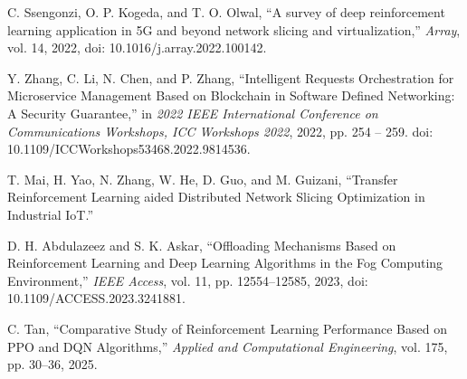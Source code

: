 \cite{b37} C. Ssengonzi, O. P. Kogeda, and T. O. Olwal, ``A survey of deep reinforcement learning application in 5G and beyond network slicing and virtualization,'' \emph{Array}, vol. 14, 2022, doi: 10.1016/j.array.2022.100142.

\cite{b38} Y. Zhang, C. Li, N. Chen, and P. Zhang, ``Intelligent Requests Orchestration for Microservice Management Based on Blockchain in Software Defined Networking: A Security Guarantee,'' in \emph{2022 IEEE International Conference on Communications Workshops, ICC Workshops 2022}, 2022, pp. 254 -- 259. doi: 10.1109/ICCWorkshops53468.2022.9814536.

\cite{b39} T. Mai, H. Yao, N. Zhang, W. He, D. Guo, and M. Guizani, ``Transfer Reinforcement Learning aided Distributed Network Slicing Optimization in Industrial IoT.''

\cite{b40} D. H. Abdulazeez and S. K. Askar, ``Offloading Mechanisms Based on Reinforcement Learning and Deep Learning Algorithms in the Fog Computing Environment,'' \emph{IEEE Access}, vol. 11, pp. 12554--12585, 2023, doi: 10.1109/ACCESS.2023.3241881.

\cite{b41} C. Tan, ``Comparative Study of Reinforcement Learning Performance Based on PPO and DQN Algorithms,'' \emph{Applied and Computational Engineering}, vol. 175, pp. 30--36, 2025.

~
